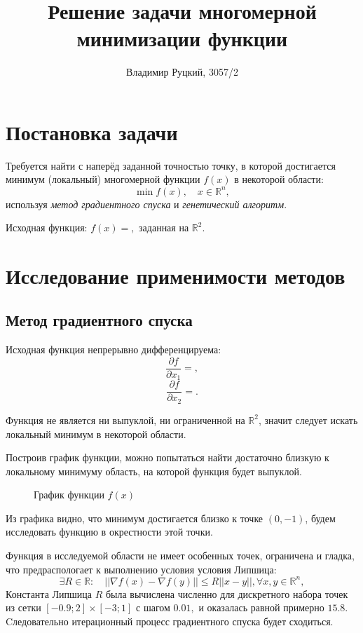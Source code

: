\documentclass[10pt,a4paper,titlepage]{article}
\title{Решение задачи многомерной минимизации функции}
\author{Владимир Руцкий, 3057/2}
\date{} %
\newcommand\RR{\mathbb{R}}
\begin{document}
\maketitle
\thispagestyle{empty}

\section{Постановка задачи}
Требуется найти с наперёд заданной точностью точку, в которой достигается минимум (локальный) многомерной функции $f(x)$ 
в некоторой области:
$$ \min f(x), \quad x \in \RR^n, $$
используя \textit{метод градиентного спуска} и \textit{генетический алгоритм}.

Исходная функция: $f(x) = ,$ заданная на $\RR^2.$ %

\section{Исследование применимости методов}
\subsection{Метод градиентного спуска}
Исходная функция непрерывно дифференцируема:
$$
  \frac{\partial f}{\partial x_1} = ,
$$
$$
  \frac{\partial f}{\partial x_2} = .
$$

Функция не является ни выпуклой, ни ограниченной на $\RR^2$, значит следует искать локальный минимум в некоторой области.

Построив график функции, можно попытаться найти достаточно близкую к локальному минимуму область, 
на которой функция будет выпуклой.
\begin{figure}[h]
  \label{function-graph}
  \caption{График функции $f(x)$}
  \begin{center}
  
  \end{center}
\end{figure}

Из графика видно, что минимум достигается близко к точке $(0, -1)$, будем исследовать функцию в окрестности этой точки.

Функция в исследуемой области не имеет особенных точек, ограничена и гладка, 
что предраспологает к выполнению условия условия Липшица:
$$
  \exists R \in \RR: \quad \left|\left| \nabla f(x) - \nabla f(y) \right|\right| \leqslant R || x - y ||, \forall x, y \in \RR^n,
$$
Константа Липшица $R$ была вычислена численно для дискретного набора точек из сетки 
$[-0.9; 2] \times [-3; 1]$ с шагом $0.01,$ %
и оказалась равной примерно $15.8.$ %
Cледовательно итерационный процесс градиентного спуска будет сходиться.
\end{document}
